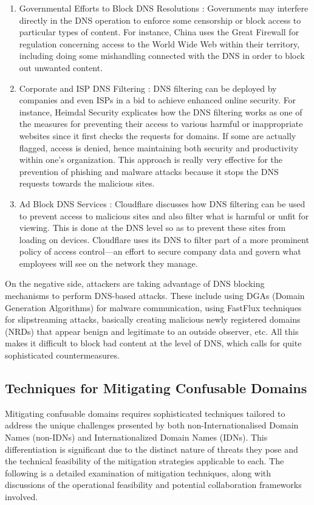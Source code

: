 \begin{enumerate}
    \item Governmental Efforts to Block DNS Resolutions : Governments may interfere directly in the DNS operation to enforce some censorship or block access to particular types of content. For instance, China uses the Great Firewall for regulation concerning access to the World Wide Web within their territory, including doing some mishandling connected with the DNS in order to block out unwanted content. \cite{XuAlbert2017MediaCensorship}
    \item Corporate and ISP DNS Filtering : DNS filtering can be deployed by companies and even ISPs in a bid to achieve enhanced online security. For instance, Heimdal Security explicates how the DNS filtering works as one of the measures for preventing their access to various harmful or inappropriate websites since it first checks the requests for domains. If some are actually flagged, access is denied, hence maintaining both security and productivity within one's organization. This approach is really very effective for the prevention of phishing and malware attacks because it stops the DNS requests towards the malicious sites. 
    \item Ad Block DNS Services :  Cloudflare discusses how DNS filtering can be used to prevent access to malicious sites and also filter what is harmful or unfit for viewing. This is done at the DNS level so as to prevent these sites from loading on devices. Cloudflare uses its DNS to filter part of a more prominent policy of access control—an effort to secure company data and govern what employees will see on the network they manage.    
\end{enumerate}

 On the negative side, attackers are taking advantage of DNS blocking mechanisms to perform DNS-based attacks. These include using DGAs (Domain Generation Algorithms) for malware communication, using FastFlux techniques for slipstreaming attacks, basically creating malicious newly registered domains (NRDs) that appear benign and legitimate to an outside observer, etc. All this makes it difficult to block bad content at the level of DNS, which calls for quite sophisticated countermeasures.


\subsection{Techniques for Mitigating Confusable Domains}

Mitigating confusable domains requires sophisticated techniques tailored to address the unique challenges presented by both non-Internationalised Domain Names (non-IDNs) and Internationalized Domain Names (IDNs). This differentiation is significant  due to the distinct nature of threats they pose and the technical feasibility of the mitigation strategies applicable to each. The following is a detailed examination of mitigation techniques, along with discussions of the operational feasibility and potential collaboration frameworks involved.

